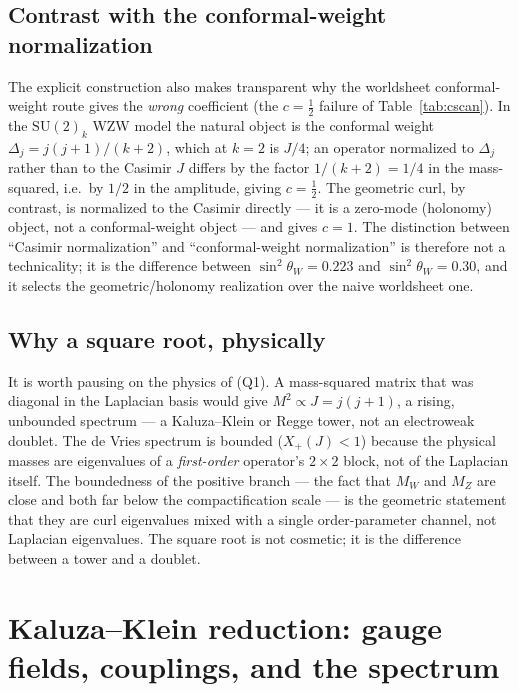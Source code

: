 \documentclass[11pt]{article}
\theoremstyle{plain}
\theoremstyle{definition}
\newcommand{\Xp}{X_{+}}
\newcommand{\sinsq}{\sin^{2}\theta_W}
\newcommand{\SU}{\mathrm{SU}}
\begin{document}
\subsection{Contrast with the conformal-weight normalization}

The explicit construction also makes transparent why the worldsheet
conformal-weight route gives the \emph{wrong} coefficient (the
$c=\tfrac12$ failure of Table~\ref{tab:cscan}). In the $\SU(2)_k$ WZW
model the natural object is the conformal weight $\Delta_j=j(j+1)/(k+2)$,
which at $k=2$ is $J/4$; an operator normalized to $\Delta_j$ rather than to
the Casimir $J$ differs by the factor $1/(k+2)=1/4$ in the mass-squared, i.e.\
by $1/2$ in the amplitude, giving $c=\tfrac12$. The geometric curl, by
contrast, is normalized to the Casimir directly --- it is a zero-mode
(holonomy) object, not a conformal-weight object --- and gives $c=1$. The
distinction between ``Casimir normalization'' and ``conformal-weight
normalization'' is therefore not a technicality; it is the difference
between $\sinsq=0.223$ and $\sinsq=0.30$, and it selects the geometric/holonomy
realization over the naive worldsheet one.

\subsection{Why a square root, physically}

It is worth pausing on the physics of (Q1). A mass-squared matrix that was
diagonal in the Laplacian basis would give $M^2\propto J=j(j+1)$, a
rising, unbounded spectrum --- a Kaluza--Klein or Regge tower, not an
electroweak doublet. The de Vries spectrum is bounded
($\Xp(J)<1$) because the physical masses are eigenvalues of a
\emph{first-order} operator's $2\times2$ block, not of the Laplacian
itself. The boundedness of the positive branch --- the fact that $M_W$ and
$M_Z$ are close and both far below the compactification scale --- is the
geometric statement that they are curl eigenvalues mixed with a single
order-parameter channel, not Laplacian eigenvalues. The square root is not
cosmetic; it is the difference between a tower and a doublet.

\section{Kaluza--Klein reduction: gauge fields, couplings, and the spectrum}
\label{sec:reduction}
\end{document}
